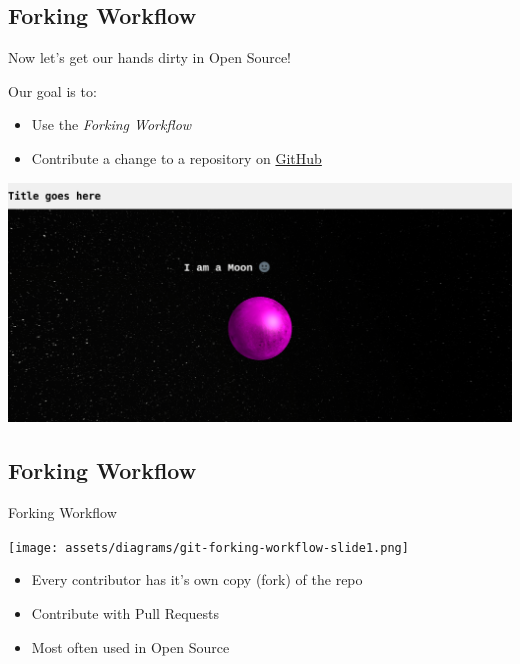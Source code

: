 \subsection{Forking Workflow}
\begin{frame}[fragile]
  \subslidetitle

  Now let's get our hands dirty in Open Source! \\
  \vspace{1em}

  Our goal is to:
  \begin{itemize}
    \item Use the \textit{Forking Workflow}
    \item Contribute a change to a repository on \href{https://github.com}{GitHub}
  \end{itemize}

  \centerline{\includegraphics[width=\textwidth]{../assets/images/gitmoon-colab.png}}

\end{frame}

\subsection{Forking Workflow}
\begin{frame}[fragile]
  \subslidetitle
  Forking Workflow
  \centerline{\texttt{[image: assets/diagrams/git-forking-workflow-slide1.png]}}

  \vspace{2em}
  \begin{itemize}
    \item Every contributor has it's own copy (fork) of the repo
    \item Contribute with Pull Requests
    \item Most often used in Open Source
  \end{itemize}

\end{frame}

